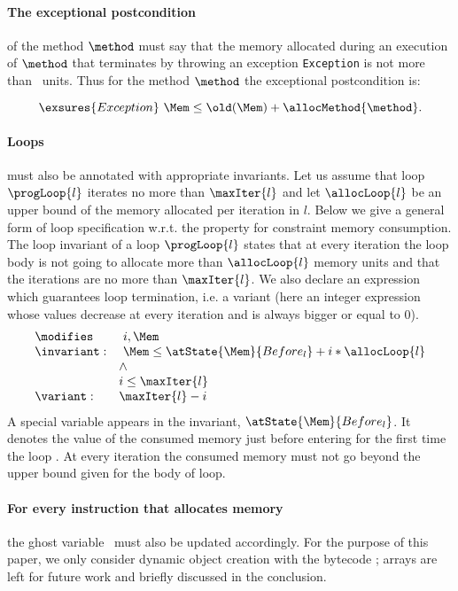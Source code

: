 \paragraph{The exceptional postcondition} of the method $\method$ must
say that the memory allocated during an execution of $\method$ that
terminates by throwing an exception \texttt{Exception} is not more
than \allocMethod{\method}\ units. Thus for the method $\method$ the
exceptional postcondition is:

$$
\exsures{Exception} \  \Mem \leq \old(\Mem) + \allocMethod{\method}.
$$


\paragraph{Loops} must also be annotated with appropriate invariants. 
Let us assume that loop $\progLoop{l}$ iterates no more than $\maxIter{l}$ and let $\allocLoop{l}$ be an upper bound of the memory allocated per iteration in $l$.
Below we give a general form of loop specification w.r.t. the property for constraint memory consumption. The loop invariant of a loop $\progLoop{l}$ states that at every iteration the loop body is not going to allocate more than $\allocLoop{l}$ memory units and that the iterations are no more than $\maxIter{l}$. We also declare an expression which guarantees loop termination, i.e. a variant (here an integer expression whose values decrease at every iteration  and is always bigger or equal to 0).
$$\begin{array}{ll}
\modifies &  \ i, \Mem \\
\invariant: & \ \Mem \le \atState{\Mem}{Before_{l}} + i * \allocLoop{l} \\
                & \wedge \\
                & i \le \maxIter{l}\\
\variant: & \maxIter{l} - i \\
\end{array}$$
 A special variable appears in the invariant, $\atState{\Mem}{Before_{l}}$. It denotes the value of the consumed memory just before entering for the first time the loop . At every iteration the consumed memory must not go beyond the upper bound given for the body of loop.

\paragraph{For every instruction that allocates memory} the ghost
variable \Mem\ must also be updated accordingly. For the purpose of
this paper, we only consider dynamic object creation with the bytecode
\new; arrays are left for future work and briefly discussed in the
conclusion. 

